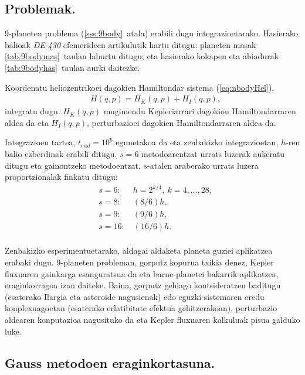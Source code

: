\subsection{Problemak.}


9-planeten problema (\ref{sss:9body}~atala) erabili dugu integrazioetarako. Hasierako balioak \emph{DE-430} efemerideen artikulutik hartu ditugu: planeten masak  \ref{tab:9bodymas}~taulan laburtu ditugu; eta hasierako kokapen eta abiadurak \ref{tab:9bodyhas}~taulan aurki daitezke.

Koordenatu heliozentrikoei dagokien  Hamiltondar sistema (\ref{eq:nbodyHel}),
\begin{align*}
&H(q,p)=H_K(q,p)+H_I(q,p),
\end{align*}
integratu dugu. $H_K(q,p)$ mugimendu Kepleriarrari dagokion Hamiltondarraren aldea da  eta $H_I(q,p)$, perturbazioei dagokien Hamiltondarraren aldea da. 

Integrazioen tartea, $t_{end}=10^6$ egunetakoa da eta zenbakizko integrazioetan, $h$-ren balio ezberdinak erabili ditugu. $s=6$ metodoarentzat urrats luzerak aukeratu ditugu eta gainontzeko metodoentzat, $s$-atalen araberako urrats luzera proportzionalak finkatu ditugu:
\begin{align*}
&s=6: \quad  \ \ h=2^{k/4}, \ k=4,\dots,28, \\
&s=8: \quad  \ \ (8/6)h, \\
&s=9: \quad  \ \ (9/6)h, \\
&s=16: \quad (16/6)h. \\
\end{align*} 

Zenbakizko esperimentuetarako, aldagai aldaketa planeta guziei aplikatzea erabaki dugu. $9$-planeten probleman, gorputz kopurua txikia denez,  Kepler fluxuaren gainkarga esanguratsua da eta  barne-planetei bakarrik aplikatzea, eraginkorragoa izan daiteke. Baina, gorputz gehiago kontsideratzen baditugu (esaterako Ilargia eta asteroide nagusienak) edo eguzki-sistemaren eredu konplexuagoetan (esaterako erlatibitate efektua gehitzerakoan), perturbazio aldearen konputazioa nagusituko da eta Kepler fluxuaren kalkuluak pisua galduko luke. 


\subsection*{Gauss metodoen eraginkortasuna.}


